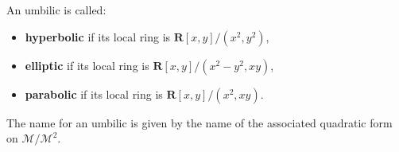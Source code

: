 An umbilic is called:
\begin{itemize}
\item \textbf{hyperbolic} if its local ring is $\mathbf{R}[x, y]/(x^2, y^2)$,
\item \textbf{elliptic} if its local ring is $\mathbf{R}[x, y]/(x^2 - y^2, xy)$,
\item \textbf{parabolic} if its local ring is $\mathbf{R}[x, y]/(x^2, xy)$.
\end{itemize}
The name for an umbilic is given by the name of the associated quadratic form on $\mathcal{M}/\mathcal{M}^2$.
